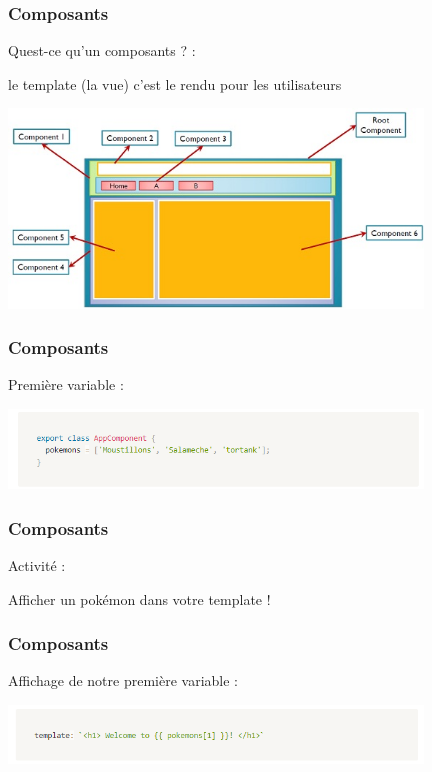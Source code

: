 \documentclass[10pt]{beamer}
\begin{document}
	\begin{frame}
		\frametitle{Composants}

		Quest-ce qu'un composants ? : \newline \newline

		le template (la vue) c'est le rendu pour les utilisateurs

		\centering
		\includegraphics[width=11cm]{assets/composant} \newline


	\end{frame}

	\begin{frame}
		\frametitle{Composants}

		Première variable : \newline \newline

		\centering
		\includegraphics[width=11cm]{assets/tableauComposant} \newline

	\end{frame}

	\begin{frame}
		\frametitle{Composants}

		Activité : \newline \newline

		Afficher un pokémon dans votre template !

	\end{frame}

	\begin{frame}
		\frametitle{Composants}

		Affichage de notre première variable : \newline \newline

		\centering
		\includegraphics[width=11cm]{assets/templateComposant} \newline

	\end{frame}
\end{document}

